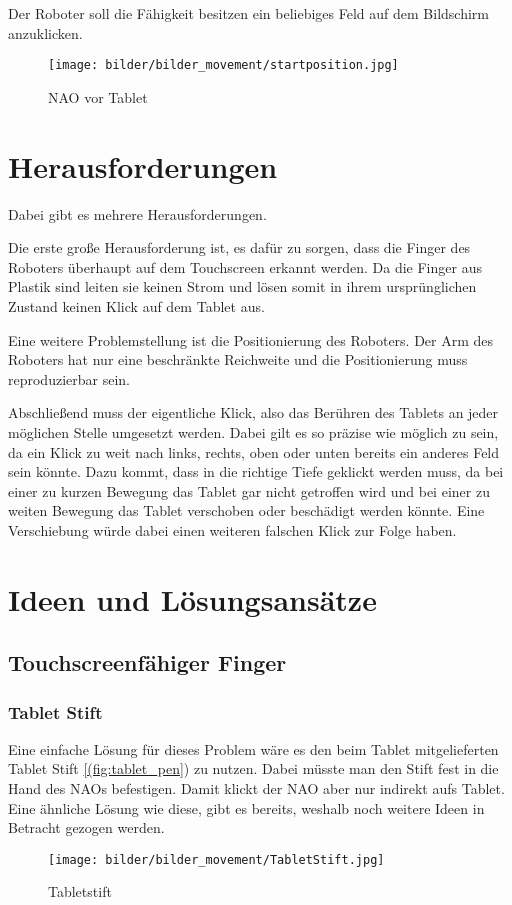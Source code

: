Der Roboter soll die Fähigkeit besitzen ein beliebiges Feld auf dem Bildschirm anzuklicken.
\begin{figure}[!htbp]
    \centering
    \texttt{[image: bilder/bilder\_movement/startposition.jpg]}
        \caption{NAO vor Tablet}
    \label{fig:nao_movement}
\end{figure}

\section{Herausforderungen}
Dabei gibt es mehrere Herausforderungen. 

Die erste große Herausforderung ist, es dafür zu sorgen, dass die Finger des Roboters überhaupt auf dem Touchscreen erkannt werden. Da die Finger aus Plastik sind leiten sie keinen Strom und lösen somit in ihrem ursprünglichen Zustand keinen Klick auf dem Tablet aus. 

Eine weitere Problemstellung ist die Positionierung des Roboters. Der Arm des Roboters hat nur eine beschränkte Reichweite und die Positionierung muss reproduzierbar sein. 

Abschließend muss der eigentliche Klick, also das Berühren des Tablets an jeder möglichen Stelle umgesetzt werden. Dabei gilt es so präzise wie möglich zu sein, da ein Klick zu weit nach links, rechts, oben oder unten bereits ein anderes Feld sein könnte. Dazu kommt, dass in die richtige Tiefe geklickt werden muss, da bei einer zu kurzen Bewegung das Tablet gar nicht getroffen wird und bei einer zu weiten Bewegung das Tablet verschoben oder beschädigt werden könnte. Eine Verschiebung würde dabei einen weiteren falschen Klick zur Folge haben.

\section{Ideen und Lösungsansätze}
\subsection{Touchscreenfähiger Finger}
\subsubsection{Tablet Stift}
Eine einfache Lösung für dieses Problem wäre es den beim Tablet mitgelieferten Tablet Stift \vref{(fig:tablet_pen}) zu nutzen. Dabei müsste man den Stift fest in die Hand des NAOs befestigen. Damit klickt der NAO aber nur indirekt aufs Tablet. Eine ähnliche Lösung wie diese, gibt es bereits, weshalb noch weitere Ideen in Betracht gezogen werden. 
\begin{figure}[!htbp]
\centering
    \texttt{[image: bilder/bilder\_movement/TabletStift.jpg]}
        \caption{Tabletstift}
    \label{fig:tablet_pen}
\end{figure}

